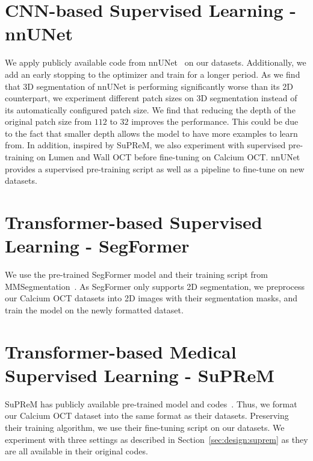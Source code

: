 \documentclass[a4paper,11pt,oneside]{report}
\begin{document}
\section{CNN-based Supervised Learning - nnUNet}
We apply publicly available code from nnUNet~\cite{Isensee2020} on our datasets. Additionally, we add an early stopping to the optimizer and train for a longer period. As we find that 3D segmentation of nnUNet is performing significantly worse than its 2D counterpart, we experiment different patch sizes on 3D segmentation instead of its automatically configured patch size. We find that reducing the depth of the original patch size from $112$ to $32$ improves the performance. This could be due to the fact that smaller depth allows the model to have more examples to learn from. In addition, inspired by SuPReM, we also experiment with supervised pre-training on Lumen and Wall OCT before fine-tuning on Calcium OCT. nnUNet provides a supervised pre-training script as well as a pipeline to fine-tune on new datasets.

\section{Transformer-based Supervised Learning - SegFormer}
We use the pre-trained SegFormer model and their training script from MMSegmentation~\cite{mmseg2020}. As SegFormer only supports 2D segmentation, we preprocess our Calcium OCT datasets into 2D images with their segmentation masks, and train the model on the newly formatted dataset.

\section{Transformer-based Medical Supervised Learning - SuPReM}
SuPReM has publicly available pre-trained model and codes~\cite{Li2024}. Thus, we format our Calcium OCT dataset into the same format as their datasets. Preserving their training algorithm, we use their fine-tuning script on our datasets. We experiment with three settings as described in Section~\ref{sec:design:suprem} as they are all available in their original codes.
\end{document}
